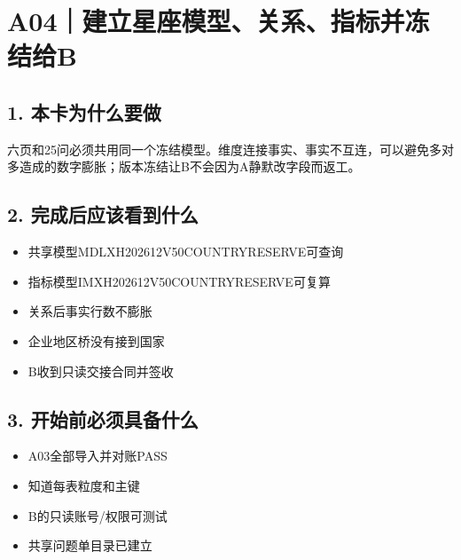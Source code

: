 \documentclass[UTF8,openany,zihao=-4]{ctexbook}
\renewcommand{\_}{\textunderscore\allowbreak}
\begin{document}
\clearpage
\section{A04｜建立星座模型、关系、指标并冻结给B}
\subsection*{1. 本卡为什么要做}
六页和25问必须共用同一个冻结模型。维度连接事实、事实不互连，可以避免多对多造成的数字膨胀；版本冻结让B不会因为A静默改字段而返工。


\subsection*{2. 完成后应该看到什么}
\begin{itemize}
\item 共享模型MDL\_XH202612\_V50\_COUNTRY\_RESERVE可查询
\item 指标模型IM\_XH202612\_V50\_COUNTRY\_RESERVE可复算
\item 关系后事实行数不膨胀
\item 企业地区桥没有接到国家
\item B收到只读交接合同并签收
\end{itemize}

\subsection*{3. 开始前必须具备什么}
\begin{itemize}[label=$\square$]
\item A03全部导入并对账PASS
\item 知道每表粒度和主键
\item B的只读账号/权限可测试
\item 共享问题单目录已建立
\end{itemize}
\end{document}
